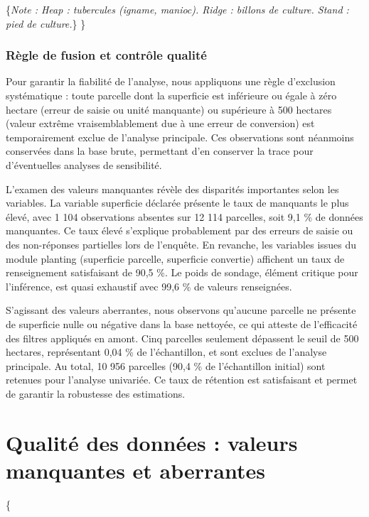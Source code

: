 \documentclass[
  french,
  10pt,
]{article}
\begin{document}
\{\footnotesize\textit{Note : Heap : tubercules (igname, manioc). Ridge : billons de culture. Stand : pied de culture.}\}
\}

\subsubsection{Règle de fusion et contrôle
qualité}\label{ruxe8gle-de-fusion-et-contruxf4le-qualituxe9}

Pour garantir la fiabilité de l'analyse, nous appliquons une règle
d'exclusion systématique : toute parcelle dont la superficie est
inférieure ou égale à zéro hectare (erreur de saisie ou unité manquante)
ou supérieure à 500 hectares (valeur extrême vraisemblablement due à une
erreur de conversion) est temporairement exclue de l'analyse principale.
Ces observations sont néanmoins conservées dans la base brute,
permettant d'en conserver la trace pour d'éventuelles analyses de
sensibilité.

L'examen des valeurs manquantes révèle des disparités importantes selon
les variables. La variable superficie déclarée présente le taux de
manquants le plus élevé, avec 1 104 observations absentes sur 12 114
parcelles, soit 9,1 \% de données manquantes. Ce taux élevé s'explique
probablement par des erreurs de saisie ou des non-réponses partielles
lors de l'enquête. En revanche, les variables issues du module planting
(superficie parcelle, superficie convertie) affichent un taux de
renseignement satisfaisant de 90,5 \%. Le poids de sondage, élément
critique pour l'inférence, est quasi exhaustif avec 99,6 \% de valeurs
renseignées.

S'agissant des valeurs aberrantes, nous observons qu'aucune parcelle ne
présente de superficie nulle ou négative dans la base nettoyée, ce qui
atteste de l'efficacité des filtres appliqués en amont. Cinq parcelles
seulement dépassent le seuil de 500 hectares, représentant 0,04 \% de
l'échantillon, et sont exclues de l'analyse principale. Au total, 10 956
parcelles (90,4 \% de l'échantillon initial) sont retenues pour
l'analyse univariée. Ce taux de rétention est satisfaisant et permet de
garantir la robustesse des estimations.

\section{Qualité des données : valeurs manquantes et
aberrantes}\label{tache19}

\{ \small {}
\end{document}
